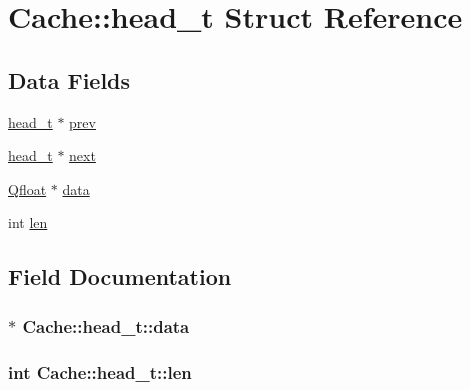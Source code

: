 \hypertarget{structCache_1_1head__t}{}\section{Cache\+:\+:head\+\_\+t Struct Reference}
\label{structCache_1_1head__t}
\subsection*{Data Fields}
\begin{DoxyCompactItemize}
\item 
\hyperlink{structCache_1_1head__t}{head\+\_\+t} $\ast$ \hyperlink{structCache_1_1head__t_a82b1a4d1a105769f85cce8d51c19860e}{prev}
\item 
\hyperlink{structCache_1_1head__t}{head\+\_\+t} $\ast$ \hyperlink{structCache_1_1head__t_aa152a104ec07250949c234d164f5f3fd}{next}
\item 
\hyperlink{svm__core_8cpp_a8755d90a54ecfb8d15051af3e0542592}{Qfloat} $\ast$ \hyperlink{structCache_1_1head__t_a630b97ea8171e7e8c1f4ff6c3b12c587}{data}
\item 
int \hyperlink{structCache_1_1head__t_af62eb0bc8e61b1889fef2bf7f8a0222b}{len}
\end{DoxyCompactItemize}


\subsection{Field Documentation}
\subsubsection[{data}]{$\ast$ Cache\+::head\+\_\+t\+::data}\hypertarget{structCache_1_1head__t_a630b97ea8171e7e8c1f4ff6c3b12c587}{}\label{structCache_1_1head__t_a630b97ea8171e7e8c1f4ff6c3b12c587}
\subsubsection[{len}]{\setlength{\rightskip}{0pt plus 5cm}int Cache\+::head\+\_\+t\+::len}\hypertarget{structCache_1_1head__t_af62eb0bc8e61b1889fef2bf7f8a0222b}{}\label{structCache_1_1head__t_af62eb0bc8e61b1889fef2bf7f8a0222b}
